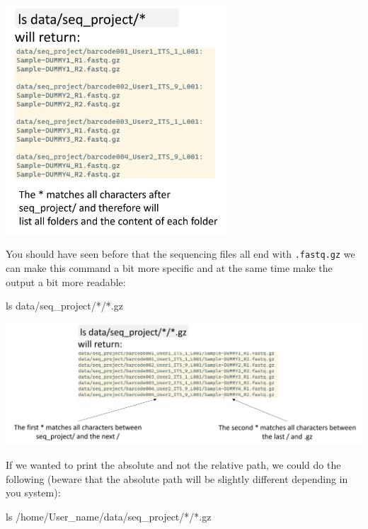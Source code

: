 \documentclass[
  letterpaper,
  DIV=11,
  numbers=noendperiod]{scrreprt}
\newenvironment{Shaded}{}{}
\newcommand{\FunctionTok}[1]{\textcolor[rgb]{0.44,0.26,0.76}{#1}}
\newcommand{\NormalTok}[1]{\textcolor[rgb]{0.14,0.16,0.18}{#1}}
\newcommand{\PreprocessorTok}[1]{\textcolor[rgb]{0.84,0.23,0.29}{#1}}
\begin{document}
\includegraphics[width=3.28125in,height=\textheight]{../img/wildcards_0.png}

You should have seen before that the sequencing files all end with
\texttt{.fastq.gz} we can make this command a bit more specific and at
the same time make the output a bit more readable:

\begin{Shaded}
\begin{Highlighting}[]
\FunctionTok{ls}\NormalTok{ data/seq\_project/}\PreprocessorTok{*}\NormalTok{/}\PreprocessorTok{*}\NormalTok{.gz}
\end{Highlighting}
\end{Shaded}

\includegraphics[width=5.8125in,height=\textheight]{../img/wildcards_1.png}

If we wanted to print the absolute and not the relative path, we could
do the following (beware that the absolute path will be slightly
different depending in you system):

\begin{Shaded}
\begin{Highlighting}[]
\FunctionTok{ls}\NormalTok{ /home/User\_name/data/seq\_project/}\PreprocessorTok{*}\NormalTok{/}\PreprocessorTok{*}\NormalTok{.gz}
\end{Highlighting}
\end{Shaded}
\end{document}
